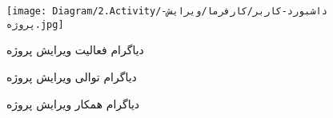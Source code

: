 \begin{figure}[H]
	\centering
	\texttt{[image: Diagram/2.Activity/داشبورد-کاربر/کارفرما/ویرایش-پروژه.jpg]}
	\caption{دیاگرام فعالیت ویرایش پروژه}
	\label{fig:a:ویرایش-پروژه}
\end{figure}
\begin{figure}[H]
	\centering
	\caption{دیاگرام توالی ویرایش پروژه}
	\label{fig:s:ویرایش-پروژه}
\end{figure}
\begin{figure}[H]
\centering
\caption{دیاگرام همکار ویرایش پروژه}
\label{fig:c:ویرایش-پروژه}
\end{figure}
